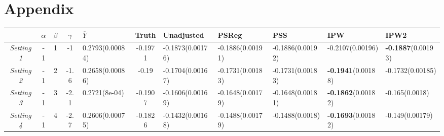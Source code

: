 \documentclass{article}
\begin{document}
	\newpage   %
	
	
	\printbibliography
	
	\newpage
	\section{Appendix}
	
	\begin{table}[H]
		\centering
		\begin{tabular}{ccccp{15mm}||cp{15mm}p{15mm}p{15mm}p{15mm}p{15mm}}
			\hline
			& $\alpha$ & $\beta$ & $\gamma$ & $\overline{Y}$ & Truth & Unadjusted & PSReg & PSS & IPW & IPW2 \\ \hline 
			\textsl{Setting 1} & -1 & 1 & -1 & 0.2793\newline (0.00084) & -0.1971 & -0.1873\newline (0.00176) & -0.1886\newline (0.00191) & -0.1886\newline (0.00192) & -0.2107\newline (0.00196) & \textbf{-0.1887}\newline (0.00193) \\ 
			\textsl{Setting 2} & -1 & 2 & -1.6 & 0.2658\newline (0.00086) & -0.19 & -0.1704\newline (0.00167) & -0.1731\newline (0.00183) & -0.1731\newline (0.00183) & \textbf{-0.1941}\newline (0.00188) & -0.1732\newline (0.00185) \\ 
			\textsl{Setting 3} & -1 & 3 & -2.1 & 0.2721\newline (8e-04) & -0.1907 & -0.1606\newline (0.00169) & -0.1648\newline (0.00179) & -0.1648\newline (0.00181) & \textbf{-0.1862}\newline (0.00182) & -0.165\newline (0.0018) \\ 
			\textsl{Setting 4} & -1 & 4 & -2.7 & 0.2606\newline (0.00075) & -0.1826 & -0.1432\newline (0.00168) & -0.1488\newline (0.00179) & -0.1488\newline (0.0018) &\textbf{ -0.1693}\newline (0.00182) & -0.149\newline (0.00179) \\ 

\end{tabular}
\end{table}
\end{document}
